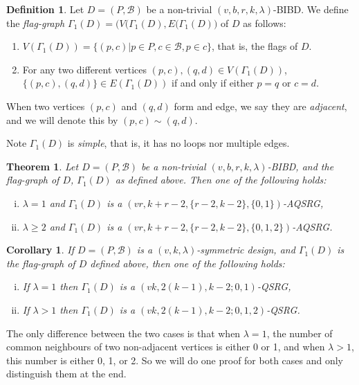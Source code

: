 \documentclass[letterpaper,10pt]{article}
\theoremstyle{plain}
\newtheorem{thm}{Theorem}
\newtheorem{cor}{Corollary}
\theoremstyle{definition}
\newtheorem{df}{Definition}
\begin{document}
\begin{df}
  Let $D=(P,\mathcal{B})$ be a non-trivial $(v,b,r,k,\lambda)$-BIBD. We define the \emph{flag-graph $\Gamma_1(D)=\big(V(\Gamma_1(D),E(\Gamma_1(D)\big)$} of $D$ as follows:
  \begin{enumerate}
      \item $V(\Gamma_1(D))=\{(p,c) |p\in P, c\in\mathcal{B}, p\in c\}$, that is, the flags of $D$.
      \item For any two different vertices $(p,c),(q,d)\in V(\Gamma_1(D))$, $\{(p,c),(q,d)\}\in E(\Gamma_1(D))$ if and only if either $p=q$ or $c=d$.
  \end{enumerate}
  When two vertices $(p,c)$ and $(q,d)$ form and edge, we say they are \emph{adjacent}, and we will denote this by $(p,c)\sim(q,d)$.
\end{df}

 Note $\Gamma_1(D)$ is \emph{simple}, that is, it has no loops nor multiple edges. 

 \begin{thm}\label{t1}
     Let $D=(P,\mathcal{B})$ be a non-trivial $(v,b,r,k,\lambda)$-BIBD, and the flag-graph of $D$, $\Gamma_1(D)$ as defined above. Then one of the following holds:
     \begin{enumerate}[(i)]
         \item $\lambda=1$ and $\Gamma_1(D)$ is a $(vr,k+r-2,\{r-2,k-2\},\{0,1\})$-AQSRG, 
         \item $\lambda\geq 2$ and $\Gamma_1(D)$ is a $(vr,k+r-2,\{r-2,k-2\},\{0,1,2\})$-AQSRG.
     \end{enumerate}
 \end{thm}

 \begin{cor}\label{c1}
 If $D=(P,\mathcal{B})$ is a $(v,k,\lambda)$-symmetric design, and $\Gamma_1(D)$ is the flag-graph of $D$ defined above, then one of the following holds:
 \begin{enumerate}[(i)]
     \item If $\lambda=1$ then $\Gamma_1(D)$ is a $(vk,2(k-1),k-2;0,1)$-QSRG,
     \item If $\lambda>1$ then $\Gamma_1(D)$ is a $(vk,2(k-1),k-2;0,1,2)$-QSRG.
 \end{enumerate}
 \end{cor}

 The only difference between the two cases is that when $\lambda=1$, the number of common neighbours of two non-adjacent vertices is either 0 or 1, and when $\lambda>1$, this number is either 0, 1, or 2. So we will do one proof for both cases and only distinguish them at the end.
\end{document}
